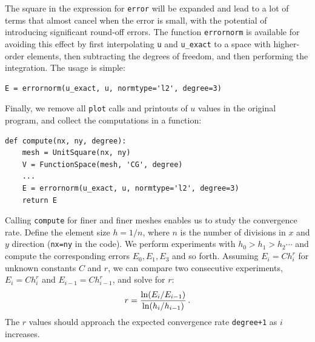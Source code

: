 The square in the expression for {\fontsize{12pt}{12pt}\texttt{error}} will be expanded and lead
to a lot of terms that almost cancel when the error is small, with the
potential of introducing significant round-off errors.
The function {\fontsize{12pt}{12pt}\texttt{errornorm}} is available for avoiding this effect
by first interpolating {\fontsize{12pt}{12pt}\texttt{u}} and {\fontsize{12pt}{12pt}\verb!u_exact!} to a space with
higher-order elements, then subtracting the degrees of freedom, and
then performing the integration. The usage is simple:
\begin{Verbatim}[fontsize=\fontsize{10pt}{10pt},tabsize=8,baselinestretch=1.05,
fontfamily=tt,xleftmargin=7mm]
E = errornorm(u_exact, u, normtype='l2', degree=3)
\end{Verbatim}
\noindent

Finally, we remove all {\fontsize{12pt}{12pt}\texttt{plot}} calls and printouts of $u$ values
in the original program, and
collect the computations in a function:
\begin{Verbatim}[fontsize=\fontsize{10pt}{10pt},tabsize=8,baselinestretch=1.05,
fontfamily=tt,xleftmargin=7mm]
def compute(nx, ny, degree):
    mesh = UnitSquare(nx, ny)
    V = FunctionSpace(mesh, 'CG', degree)
    ...
    E = errornorm(u_exact, u, normtype='l2', degree=3)
    return E
\end{Verbatim}
\noindent

Calling {\fontsize{12pt}{12pt}\texttt{compute}} for finer and finer meshes enables us to
study the convergence rate. Define the element size
$h=1/n$, where $n$ is the number of divisions in $x$ and $y$ direction
({\fontsize{12pt}{12pt}\texttt{nx=ny}} in the code). We perform experiments with $h_0>h_1>h_2\cdots$
and compute the corresponding errors $E_0, E_1, E_3$ and so forth.
Assuming $E_i=Ch_i^r$ for unknown constants $C$ and $r$, we can compare
two consecutive experiments, $E_i=Ch_i^r$ and $E_{i-1}=Ch_{i-1}^r$,
and solve for $r$:
\[ r = {\ln(E_i/E_{i-1})\over\ln (h_i/h_{i-1})}\thinspace .\]
The $r$ values should approach the expected convergence
rate {\fontsize{12pt}{12pt}\texttt{degree+1}} as $i$ increases.

